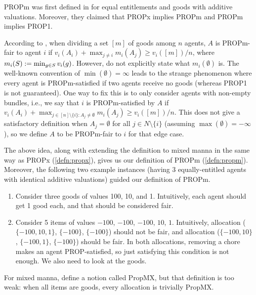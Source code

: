 PROPm was first defined in \citet{baklanov2021achieving}
for equal entitlements and goods with additive valuations.
Moreover, they claimed that PROPx implies PROPm and PROPm implies PROP1.

According to \citet{baklanov2021achieving}, when dividing a set $[m]$ of goods among $n$ agents,
$A$ is PROPm-fair to agent $i$ if $v_i(A_i) + \max_{j \neq i} m_i(A_j) \ge v_i([m])/n$,
where $m_i(S) := \min_{g \in S} v_i(g)$.
However, \citet{baklanov2021achieving} do not explicitly state what $m_i(\emptyset)$ is.
The well-known convention of $\min(\emptyset) = \infty$ leads to the strange phenomenon
where every agent is PROPm-satisfied if two agents receive no goods
(whereas PROP1 is not guaranteed).
One way to fix this is to only consider agents with non-empty bundles,
i.e., we say that $i$ is PROPm-satisfied by $A$ if
$v_i(A_i) + \max_{j \in [n] \setminus \{i\}: A_j \neq \emptyset} m_i(A_j) \ge v_i([m])/n$.
This does not give a satisfactory definition when $A_j = \emptyset$
for all $j \in N \setminus \{i\}$ (assuming $\max(\emptyset) = -\infty$),
so we define $A$ to be PROPm-fair to $i$ for that edge case.

The above idea, along with extending the definition to mixed manna
in the same way as PROPx (\cref{defn:propx}),
gives us our definition of PROPm (\cref{defn:propm}).
Moreover, the following two example instances
(having 3 equally-entitled agents with identical additive valuations)
guided our definition of PROPm.

\begin{enumerate}
\item Consider three goods of values 100, 10, and 1.
    Intuitively, each agent should get 1 good each, and that should be considered fair.
\item Consider 5 items of values $-100$, $-100$, $-100$, $10$, $1$.
    Intuitively, allocation ($\{-100, 10, 1\}$, $\{-100\}$, $\{-100\}$) should not be fair,
    and allocation ($\{-100, 10\}$, $\{-100, 1\}$, $\{-100\}$) should be fair.
    In both allocations, removing a chore makes an agent PROP-satisfied, so just
    satisfying this condition is not enough. We also need to look at the goods.
\end{enumerate}

For mixed manna, \citet{livanos2022almost} define a notion called PropMX,
but that definition is too weak: when all items are goods, every allocation is trivially PropMX.

